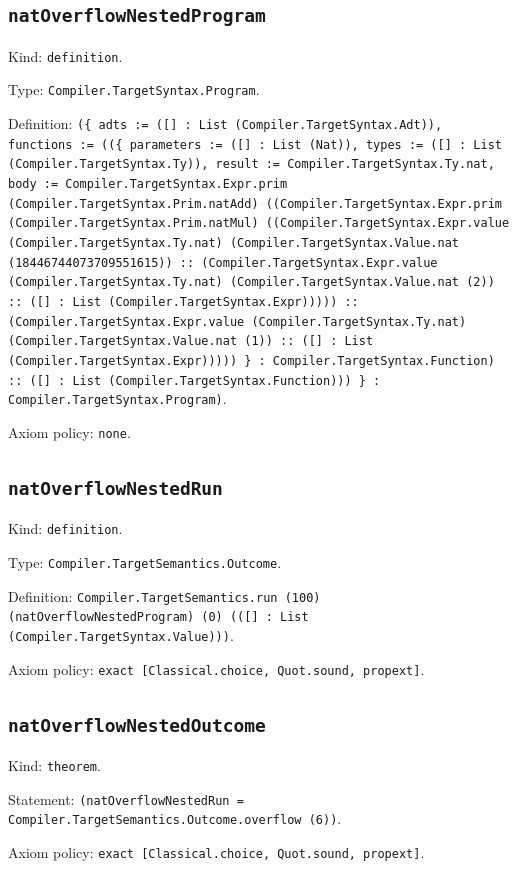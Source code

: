 \documentclass[11pt]{article}
\begin{document}
\subsection*{\texttt{natOverflowNestedProgram}}
\noindent Kind: \texttt{definition}.\par
\noindent Type: \texttt{Compiler.TargetSyntax.Program}.\par
\noindent Definition: \texttt{(\{ adts := ([] : List (Compiler.TargetSyntax.Adt)), functions := ((\{ parameters := ([] : List (Nat)), types := ([] : List (Compiler.TargetSyntax.Ty)), result := Compiler.TargetSyntax.Ty.nat, body := Compiler.TargetSyntax.Expr.prim (Compiler.TargetSyntax.Prim.natAdd) ((Compiler.TargetSyntax.Expr.prim (Compiler.TargetSyntax.Prim.natMul) ((Compiler.TargetSyntax.Expr.value (Compiler.TargetSyntax.Ty.nat) (Compiler.TargetSyntax.Value.nat (18446744073709551615)) :: (Compiler.TargetSyntax.Expr.value (Compiler.TargetSyntax.Ty.nat) (Compiler.TargetSyntax.Value.nat (2)) :: ([] : List (Compiler.TargetSyntax.Expr))))) :: (Compiler.TargetSyntax.Expr.value (Compiler.TargetSyntax.Ty.nat) (Compiler.TargetSyntax.Value.nat (1)) :: ([] : List (Compiler.TargetSyntax.Expr))))) \} : Compiler.TargetSyntax.Function) :: ([] : List (Compiler.TargetSyntax.Function))) \} : Compiler.TargetSyntax.Program)}.\par
\noindent Axiom policy: \texttt{none}.\par
\subsection*{\texttt{natOverflowNestedRun}}
\noindent Kind: \texttt{definition}.\par
\noindent Type: \texttt{Compiler.TargetSemantics.Outcome}.\par
\noindent Definition: \texttt{Compiler.TargetSemantics.run (100) (natOverflowNestedProgram) (0) (([] : List (Compiler.TargetSyntax.Value)))}.\par
\noindent Axiom policy: \texttt{exact [Classical.choice, Quot.sound, propext]}.\par
\subsection*{\texttt{natOverflowNestedOutcome}}
\noindent Kind: \texttt{theorem}.\par
\noindent Statement: \texttt{(natOverflowNestedRun = Compiler.TargetSemantics.Outcome.overflow (6))}.\par
\noindent Axiom policy: \texttt{exact [Classical.choice, Quot.sound, propext]}.\par
\end{document}
